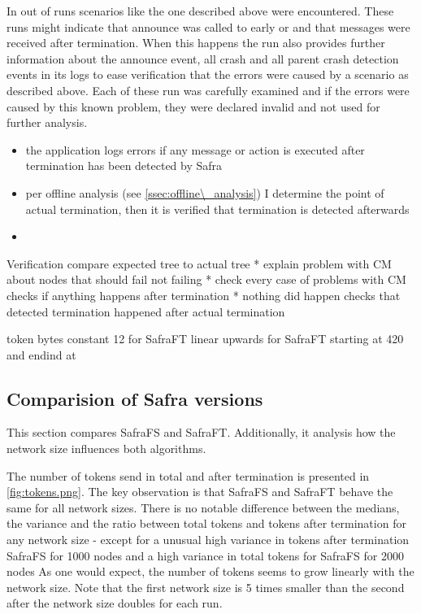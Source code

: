 In %
out of %
runs scenarios like the one described above were encountered. 
These runs might indicate that announce was called to early or and that messages were received after termination.
When this happens the run also provides further information about the announce event, all crash and all parent crash detection events in its logs to ease verification that the errors were caused by a scenario as described above.
Each of these run was carefully examined and if the errors were caused by this known problem, they were declared invalid and not used for further analysis.


\begin{itemize}
	\item the application logs errors if any message or action is executed after termination has been detected by Safra
	\item per offline analysis (see \cref{ssec:offline\_analysis}) I determine the point of actual termination, then it is verified that termination is detected afterwards
	\item 
\end{itemize}

Verification
compare expected tree to actual tree
* explain problem with CM about nodes that should fail not failing
* check every case of problems with CM
checks if anything happens after termination
* nothing did happen
checks that detected termination happened after actual termination  


token bytes constant 12 for SafraFT linear upwards for SafraFT starting at 420 and endind at 

\subsection{Comparision of Safra versions}
This section compares SafraFS and SafraFT. 
Additionally, it analysis how the network size influences both algorithms.

The number of tokens send in total and after termination is presented in \cref{fig:tokens.png}.
The key observation is that SafraFS and SafraFT behave the same for all network sizes.
There is no notable difference between the medians, the variance and the ratio between total tokens and tokens after termination for any network size - except for a unusual high variance in tokens after termination SafraFS for 1000 nodes and a high variance in total tokens for SafraFS for 2000 nodes %
As one would expect, the number of tokens seems to grow linearly with the network size.
Note that the first network size is 5 times smaller than the second after the network size doubles for each run.

